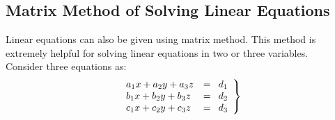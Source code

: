 \documentclass[a4paper, 12pt]{report}
\begin{document}
{\subsection{Matrix Method of Solving Linear Equations}
      Linear equations can also be given using matrix method. This method is extremely helpful for solving linear equations in two or three variables.\\
      Consider three equations as:
      \begin{equation}
          	\left.\begin{array}{lp{0.2cm}l}
          		a_1x + a_2y + a_3z &=&d_1\\
          		b_1x + b_2y + b_3z &=&d_2\\
          		c_1x + c_2y + c_3z &=&d_3
          	\end{array}\right\}
          \end{equation}

}
\end{document}
